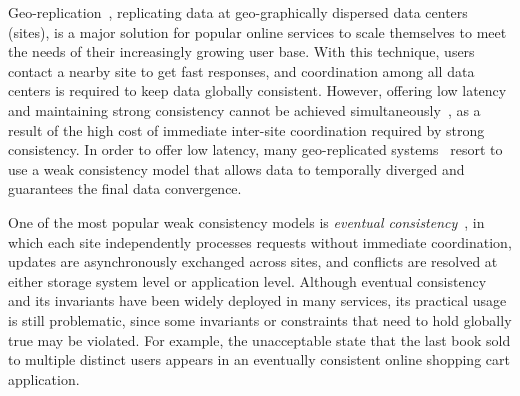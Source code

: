 

Geo-replication~\cite{Hamilton2008GeoFacebook, Cooper2008PNUTs, DeCandia2007Dynamo, 
Calder2011Azure, Corbett2012Spanner}, replicating data at geo-graphically dispersed data centers (sites), is
a major solution for popular online services to scale themselves to meet the
needs of their increasingly growing user base. With this technique, users
contact a nearby site to get fast responses, and coordination among
all data centers is required to keep data globally consistent. However, offering low latency
and maintaining strong consistency cannot be achieved simultaneously~\cite{Brewer2010CAP}, as
a result of the high cost of immediate inter-site coordination required by strong consistency. In order to
offer low latency, many geo-replicated systems~\cite{DeCandia2007Dynamo,Lloyd2011COPS} 
resort to use a weak consistency model that allows data to temporally diverged and guarantees
the final data convergence. 

One of the most popular weak consistency models is \emph{eventual consistency}~\cite{Vogels2008Eventual}, 
in which each site independently processes requests
without immediate coordination, updates are asynchronously exchanged across sites, and conflicts
are resolved at either storage system level or application level. Although eventual consistency
and its invariants have been widely deployed in many services, its
practical usage is still problematic, since some invariants or constraints that need to hold 
globally true may be violated. For example, the unacceptable state that the last book sold to
multiple distinct users appears in an eventually consistent online shopping cart application. 

